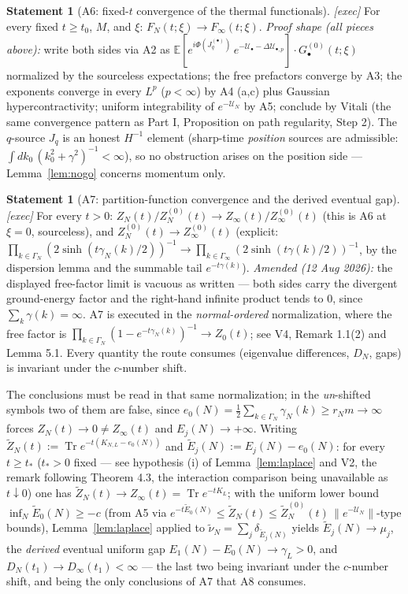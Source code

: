 \documentclass[11pt,a4paper]{article}
\theoremstyle{plain}
\theoremstyle{definition}
\newtheorem{statement}[theorem]{Statement}
\newcommand{\E}{\mathbb{E}}
\DeclareMathOperator{\Trace}{Tr}
\begin{document}
\begin{statement}[A6: fixed-$t$ convergence of the thermal functionals]\label{st:A6}
\emph{[exec]} For every fixed $t\ge t_0$, $M$, and $\xi$:
$F_N(t;\xi)\to F_\infty(t;\xi)$. \emph{Proof shape (all pieces above):} write both
sides via A2 as
$\E[e^{i\Phi(J^{(\bullet)}_q)}\,e^{-\mathcal U_\bullet-\Delta\mathcal U_{\bullet,p}}]
\cdot G^{(0)}_\bullet(t;\xi)$ normalized by the sourceless expectations; the free
prefactors converge by A3; the exponents converge in every $L^p$ ($p<\infty$) by A4
(a,c) plus Gaussian hypercontractivity; uniform integrability of
$e^{-\mathcal U_N}$ by A5; conclude by Vitali (the same convergence pattern as Part I,
Proposition on path regularity, Step 2). The $q$-source $J_q$ is an honest $H^{-1}$
element (sharp-time \emph{position} sources are admissible:
$\int dk_0\,(k_0^2+\gamma^2)^{-1}<\infty$), so no obstruction arises on the position
side --- Lemma~\ref{lem:nogo} concerns momentum only.
\end{statement}

\begin{statement}[A7: partition-function convergence and the derived eventual gap]
\label{st:A7}
\emph{[exec]} For every $t>0$:
$Z_N(t)/Z^{(0)}_N(t)\to Z_\infty(t)/Z^{(0)}_\infty(t)$ (this is A6 at $\xi=0$,
sourceless), and $Z^{(0)}_N(t)\to Z^{(0)}_\infty(t)$ (explicit:
$\prod_{k\in\Gamma_N}(2\sinh(t\gamma_N(k)/2))^{-1}
\to\prod_{k\in\Gamma_\infty}(2\sinh(t\gamma(k)/2))^{-1}$, by the dispersion lemma and
the summable tail $e^{-t\gamma(k)}$).
\emph{Amended (12 Aug 2026):} the displayed free-factor limit is vacuous as
written --- both sides carry the divergent ground-energy factor and the
right-hand infinite product tends to $0$, since $\sum_k\gamma(k)=\infty$. A7 is
executed in the \emph{normal-ordered} normalization, where the free factor is
$\prod_{k\in\Gamma_N}(1-e^{-t\gamma_N(k)})^{-1}\to Z_0(t)$; see V4,
Remark 1.1(2) and Lemma 5.1. Every quantity the route consumes (eigenvalue
differences, $D_N$, gaps) is invariant under the $c$-number shift.

The conclusions must be read in that same normalization; in the \emph{un}-shifted
symbols two of them are false, since
$e_0(N)=\tfrac12\sum_{k\in\Gamma_N}\gamma_N(k)\ge r_Nm\to\infty$ forces
$Z_N(t)\to0\ne Z_\infty(t)$ and $E_j(N)\to+\infty$. Writing
$\widetilde Z_N(t):=\Trace e^{-t(K_{N,L}-e_0(N))}$ and
$\widetilde E_j(N):=E_j(N)-e_0(N)$: for every $t\ge t_*$ ($t_*>0$ fixed --- see
hypothesis (i) of Lemma~\ref{lem:laplace} and V2, the remark following Theorem 4.3, the interaction
comparison being unavailable as $t\downarrow0$) one has
$\widetilde Z_N(t)\to Z_\infty(t)=\Trace e^{-tK_L}$; with the uniform lower bound
$\inf_N\widetilde E_0(N)\ge-c$ (from A5 via $e^{-t\widetilde E_0(N)}\le
\widetilde Z_N(t)\le\widetilde Z^{(0)}_N(t)\,\|e^{-\mathcal U_N}\|$-type bounds),
Lemma~\ref{lem:laplace} applied to
$\widetilde\nu_N=\sum_j\delta_{\widetilde E_j(N)}$ yields
$\widetilde E_j(N)\to\mu_j$, the \emph{derived} eventual uniform gap
$E_1(N)-E_0(N)\to\gamma_L>0$, and $D_N(t_1)\to D_\infty(t_1)<\infty$ --- the last
two being invariant under the $c$-number shift, and being the only conclusions of
A7 that A8 consumes.
\end{statement}
\end{document}
